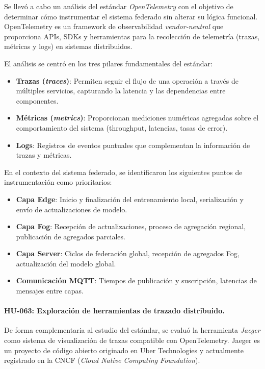\documentclass{report}
\begin{document}
Se llevó a cabo un análisis del estándar \textit{OpenTelemetry} \cite{opentelemetry2023} con el objetivo de determinar cómo instrumentar el sistema federado sin alterar su lógica funcional. OpenTelemetry es un framework de observabilidad \textit{vendor-neutral} que proporciona APIs, SDKs y herramientas para la recolección de telemetría (trazas, métricas y logs) en sistemas distribuidos.

El análisis se centró en los tres pilares fundamentales del estándar:
\begin{itemize}
    \item \textbf{Trazas (\textit{traces})}: Permiten seguir el flujo de una operación a través de múltiples servicios, capturando la latencia y las dependencias entre componentes.
    \item \textbf{Métricas (\textit{metrics})}: Proporcionan mediciones numéricas agregadas sobre el comportamiento del sistema (throughput, latencias, tasas de error).
    \item \textbf{Logs}: Registros de eventos puntuales que complementan la información de trazas y métricas.
\end{itemize}

En el contexto del sistema federado, se identificaron los siguientes puntos de instrumentación como prioritarios:
\begin{itemize}
    \item \textbf{Capa Edge}: Inicio y finalización del entrenamiento local, serialización y envío de actualizaciones de modelo.
    \item \textbf{Capa Fog}: Recepción de actualizaciones, proceso de agregación regional, publicación de agregados parciales.
    \item \textbf{Capa Server}: Ciclos de federación global, recepción de agregados Fog, actualización del modelo global.
    \item \textbf{Comunicación MQTT}: Tiempos de publicación y suscripción, latencias de mensajes entre capas.
\end{itemize}

\vspace{0.15em}
\paragraph{HU-063: Exploración de herramientas de trazado distribuido.}

De forma complementaria al estudio del estándar, se evaluó la herramienta \textit{Jaeger} \cite{jaeger2023} como sistema de visualización de trazas compatible con OpenTelemetry. Jaeger es un proyecto de código abierto originado en Uber Technologies y actualmente registrado en la CNCF (\textit{Cloud Native Computing Foundation}).
\end{document}

